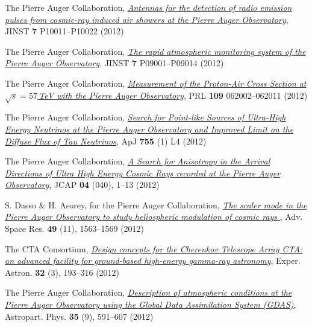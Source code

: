 \begin{etaremune}
\item {}The Pierre Auger Collaboration,
\href{http://dx.doi.org/10.1088/1748-0221/7/10/P10011}{\emph{Antennas for the
detection of radio emission pulses from cosmic-ray induced air showers at the
Pierre Auger Observatory}}, JINST {\bf{7}} P10011--P10022 (2012)

\item {}The Pierre Auger Collaboration,
\href{http://dx.doi.org/10.1088/1748-0221/7/09/P09001}{\emph{The rapid
atmospheric monitoring system of the Pierre Auger Observatory}}, JINST
{\bf{7}} P09001--P09014 (2012)

\item {}The Pierre Auger Collaboration,
\href{http://dx.doi.org/10.1103/PhysRevLett.109.062002}{\emph{Measurement of
the Proton-Air Cross Section at $\sqrt{s}=57$\,TeV with the Pierre Auger
Observatory}}, PRL {\bf{109}} 062002--062011 (2012)

\item {}The Pierre Auger Collaboration,
\href{http://dx.doi.org/10.1088/2041-8205/755/1/L4}{\emph{Search for Point-like
Sources of Ultra-High Energy Neutrinos at the Pierre Auger Observatory and
Improved Limit on the Diffuse Flux of Tau Neutrinos}}, ApJ {\bf{755}} (1) L4
(2012)

\item {}The Pierre Auger Collaboration, 
\href{http://dx.doi.org/10.1088/1475-7516/2012/04/040}{\emph{A Search for
Anisotropy in the Arrival Directions of Ultra High Energy Cosmic Rays recorded
at the Pierre Auger Observatory}}, JCAP {\bf{04}} (040), 1--13 (2012)

\item {}S. Dasso \& H. Asorey, for the Pierre Auger Collaboration,
\href{http://dx.doi.org/10.1016/j.asr.2011.12.028}{\emph{ The scaler mode in
the Pierre Auger Observatory to study heliospheric modulation of cosmic rays
}}, Adv. Space Res. {\bf{49}} (11), 1563--1569 (2012)

\item {}The CTA Consortium,
\href{http://dx.doi.org/10.1007/s10686-011-9247-0}{\emph{Design concepts for
the Cherenkov Telescope Array CTA: an advanced facility for ground-based
high-energy gamma-ray astronomy}}, Exper. Astron. {\bf{32}} (3), 193--316
(2012)

\item {}The Pierre Auger Collaboration, 
\href{http://dx.doi.org/10.1016/j.astropartphys.2011.12.002}{\emph{Description
of atmospheric conditions at the Pierre Auger Observatory using the Global Data
Assimilation System (GDAS)}}, Astropart. Phys. {\bf{35}} (9), 591--607 (2012)


\end{etaremune}
